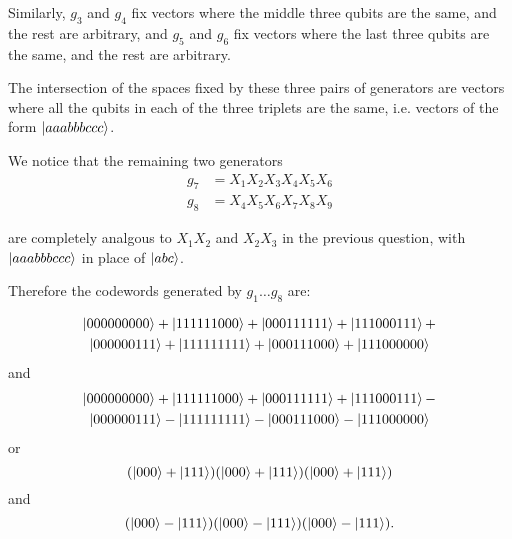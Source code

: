 \documentclass[12pt]{extarticle}
\begin{document}
Similarly, $g_3$ and $g_4$ fix vectors where the middle three qubits are the same, and the rest are arbitrary,
and $g_5$ and $g_6$ fix vectors where the last three qubits are the same, and the rest are arbitrary.

The intersection of the spaces fixed by these three pairs of generators are vectors where all the qubits
in each of the three triplets are the same, i.e. vectors of the form $\ket{aaabbbccc}$.

We notice that the remaining two generators
\begin{align*}
g_7 & = X_1X_2X_3X_4X_5X_6 \\
g_8 & = X_4X_5X_6X_7X_8X_9
\end{align*}

are completely analgous to $X_1X_2$ and $X_2X_3$ in the previous question,
with $\ket{aaabbbccc}$ in place of $\ket{abc}$.

Therefore the codewords generated by $g_1\ldots g_8$ are:

\begin{multline*}
\ket{000000000} + \ket{111111000} + \ket{000111111} + \ket{111000111} + \\
\ket{000000111} + \ket{111111111} + \ket{000111000} + \ket{111000000}
\end{multline*}
and
\begin{multline*}
\ket{000000000} + \ket{111111000} + \ket{000111111} + \ket{111000111} - \\
\ket{000000111} - \ket{111111111} - \ket{000111000} - \ket{111000000}
\end{multline*}
or
\[
(\ket{000} + \ket{111})(\ket{000} + \ket{111})(\ket{000} + \ket{111})
\]
and
\[
(\ket{000} - \ket{111})(\ket{000} - \ket{111})(\ket{000} - \ket{111}).
\]

\end{document}
